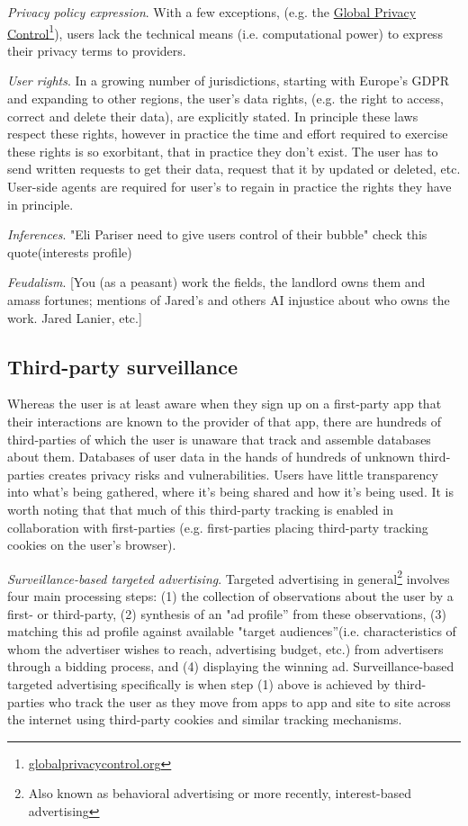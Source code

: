 \documentclass[11pt, oneside]{article}   	%
\newcommand{\hyperfootnote}[1][]{\def\ArgI{{#1}}\hyperfootnoteRelay}
\newcommand\hyperfootnoteRelay[2][]{\href{#1#2}{\ArgI}\footnote{\href{#1#2}{#2}}}
\begin{document}
\emph{Privacy policy expression}. With a few exceptions, (e.g. the \hyperfootnote[Global Privacy Control][https://]{globalprivacycontrol.org}), users  lack the technical means (i.e. computational power) to express their privacy terms to providers. 

\emph{User rights}. In a growing number of jurisdictions, starting with Europe's GDPR and expanding to other regions, the user's data rights, (e.g. the right to access, correct and delete their data), are explicitly stated. In principle these laws respect these rights, however in practice the time and effort required to exercise these rights is so exorbitant, that in practice they don't exist. The user has to send written requests to get their data, request that it by updated or deleted, etc. User-side agents are required for user's to regain in practice the rights they have in principle. 

\emph{Inferences}. "Eli Pariser need to give users control of their bubble" check this quote\cite[p66]{McNamee2020}(interests profile)

\emph{Feudalism}. [You (as a peasant) work the fields, the landlord owns them and amass fortunes; mentions of Jared's and others AI injustice about who owns the work. Jared Lanier, etc.]

\subsection{Third-party surveillance}

Whereas the user is at least aware when they sign up on a first-party app that their interactions are known to the provider of that app, there are hundreds of third-parties of which the user is unaware that track and assemble databases about them. Databases of user data in the hands of hundreds of unknown third-parties creates privacy risks and vulnerabilities. Users have little transparency into what's being gathered, where it's being shared and how it's being used. It is worth noting that that much of this third-party tracking is enabled in collaboration with first-parties (e.g. first-parties placing third-party tracking cookies on the user's browser).

\emph{Surveillance-based targeted advertising}. Targeted advertising in general\footnote{Also known as behavioral advertising or more recently, interest-based advertising} involves four main processing steps: (1) the collection of observations about the user by a first- or third-party, (2) synthesis of an "ad profile” from these observations, (3) matching this ad profile against available "target audiences”(i.e. characteristics of whom the advertiser wishes to reach, advertising budget, etc.) from advertisers through a bidding process, and (4) displaying the winning ad. Surveillance-based targeted advertising specifically is when step (1) above is achieved by third-parties who track the user as they move from apps to app and site to site across the internet using third-party cookies and similar tracking mechanisms. 
\end{document}
